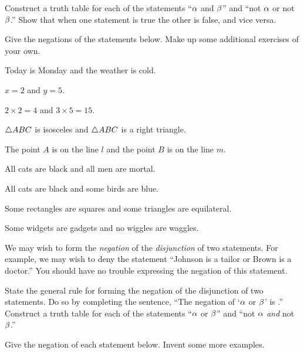 \documentclass[11pt]{book}
\begin{document}
\begin{IIproblem}
Construct a truth table for each of the statements ``$\alpha$ and
$\beta$'' and ``not $\alpha$ or not $\beta$.'' Show that when one statement is true the
other is false, and vice versa.
\end{IIproblem}


Give the negations of the statements below. Make up some additional exercises of
your own.

\begin{exercisecols}
\begin{exlist}
\item Today is Monday and the weather is cold.
\item $x = 2$ and $y = 5$.
\item $2 \times 2 = 4$ and $3 \times 5 = 15$.
\item $\triangle ABC$ is isosceles and $\triangle ABC$ is a right triangle.
\item The point $A$ is on the line $l$ and the point $B$ is on the line $m$.
\item[\stex 6.] All cats are black and all men are mortal.
\item[\stex 7.] All cats are black and some birds are blue.
\item[\stex 8.] Some rectangles are squares and some triangles are equilateral.
\item[\stex 9.] Some widgets are gadgets and no wiggles are waggles.
\end{exlist}
\end{exercisecols}

We may wish to form the \emph{negation} of the \emph{disjunction} of two
statements. For example, we may wish to deny the statement ``Johnson is a tailor
or Brown is a doctor.'' You should have no trouble expressing the negation of this
statement.

\begin{IIproblem}
State the general rule for forming the negation of the
disjunction of two statements. Do so by completing the sentence, ``The negation of
`$\alpha$ or $\beta$' is \underline{\hspace{5em}}.'' Construct a truth table for each of
the statements ``$\alpha$ or $\beta$'' and ``not $\alpha$ \emph{and} not $\beta$.''
\end{IIproblem}


Give the negation of each statement below. Invent some more examples.
\end{document}
